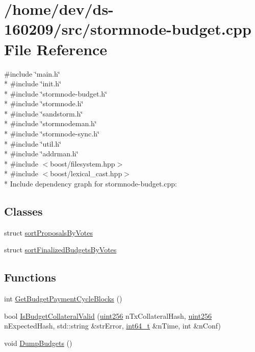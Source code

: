 \hypertarget{stormnode-budget_8cpp}{}\section{/home/dev/ds-\/160209/src/stormnode-\/budget.cpp File Reference}
\label{stormnode-budget_8cpp}
{\ttfamily \#include \char`\"{}main.\+h\char`\"{}}\\*
{\ttfamily \#include \char`\"{}init.\+h\char`\"{}}\\*
{\ttfamily \#include \char`\"{}stormnode-\/budget.\+h\char`\"{}}\\*
{\ttfamily \#include \char`\"{}stormnode.\+h\char`\"{}}\\*
{\ttfamily \#include \char`\"{}sandstorm.\+h\char`\"{}}\\*
{\ttfamily \#include \char`\"{}stormnodeman.\+h\char`\"{}}\\*
{\ttfamily \#include \char`\"{}stormnode-\/sync.\+h\char`\"{}}\\*
{\ttfamily \#include \char`\"{}util.\+h\char`\"{}}\\*
{\ttfamily \#include \char`\"{}addrman.\+h\char`\"{}}\\*
{\ttfamily \#include $<$boost/filesystem.\+hpp$>$}\\*
{\ttfamily \#include $<$boost/lexical\+\_\+cast.\+hpp$>$}\\*
Include dependency graph for stormnode-\/budget.cpp\+:
\subsection*{Classes}
\begin{DoxyCompactItemize}
\item 
struct \hyperlink{structsort_proposals_by_votes}{sort\+Proposals\+By\+Votes}
\item 
struct \hyperlink{structsort_finalized_budgets_by_votes}{sort\+Finalized\+Budgets\+By\+Votes}
\end{DoxyCompactItemize}
\subsection*{Functions}
\begin{DoxyCompactItemize}
\item 
int \hyperlink{stormnode-budget_8cpp_a25f51a3a63c2bdfca39a2c9a7f110ab1}{Get\+Budget\+Payment\+Cycle\+Blocks} ()
\item 
bool \hyperlink{stormnode-budget_8cpp_af987fefd1417be5dcd356634986dbf83}{Is\+Budget\+Collateral\+Valid} (\hyperlink{classuint256}{uint256} n\+Tx\+Collateral\+Hash, \hyperlink{classuint256}{uint256} n\+Expected\+Hash, std\+::string \&str\+Error, \hyperlink{stdint_8h_adec1df1b8b51cb32b77e5b86fff46471}{int64\+\_\+t} \&n\+Time, int \&n\+Conf)
\item 
void \hyperlink{stormnode-budget_8cpp_a277f8d83f6cfcfbe4ee3f622d38f8790}{Dump\+Budgets} ()
\end{DoxyCompactItemize}
